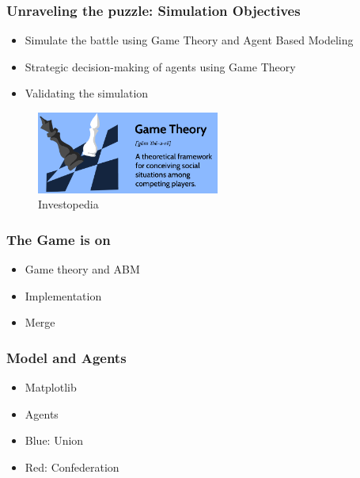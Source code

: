 \documentclass{beamer}
\begin{document}
\begin{frame}
  \frametitle{Unraveling the puzzle: Simulation Objectives}
  \begin{itemize}
    \item{Simulate the battle using Game Theory and Agent Based Modeling}
    \item{Strategic decision-making of agents using Game Theory}
    \item{Validating the simulation}
  \end{itemize}
  \begin{figure}
    \centering
      \includegraphics[width=6cm]{GameTheoryImage}
      \caption{Investopedia}
      \label{fig:Game_Theory}
    \centering
  \end{figure}
\end{frame}  

\begin{frame}
  \frametitle{The Game is on}
  \begin{itemize}
    \item{Game theory and ABM}
    \item{Implementation}
    \item{Merge}
  \end{itemize}  

\end{frame}

\begin{frame}
  \frametitle{Model and Agents}
  \begin{itemize}
    \item{Matplotlib}
    \item{Agents}
    \item{Blue: Union}
    \item{Red: Confederation}
  \end{itemize}

\end{frame}
\end{document}
